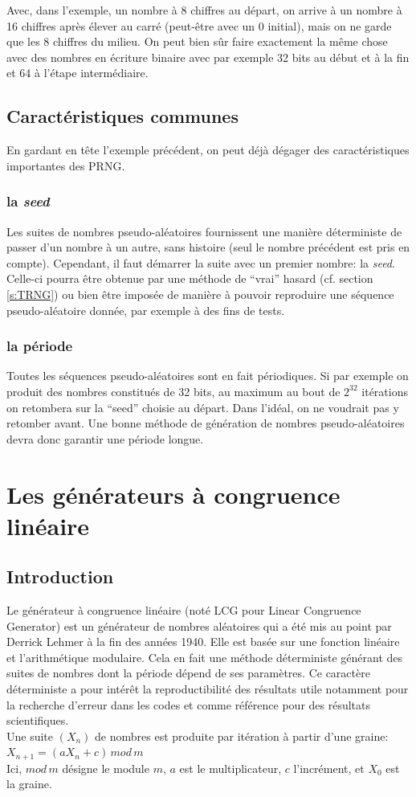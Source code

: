 \documentclass{scrartcl}
\begin{document}
Avec, dans l'exemple, un nombre à 8 chiffres au départ, on arrive à un nombre à
16 chiffres après élever au carré (peut-être avec un 0 initial), mais on ne
garde que les 8 chiffres du milieu. On peut bien sûr faire exactement la même
chose avec des nombres en écriture binaire avec par exemple 32 bits au début et
à la fin et 64 à l'étape intermédiaire.

\subsection{Caractéristiques communes}
En gardant en tête l'exemple précédent, on peut déjà dégager des
caractéristiques importantes des PRNG.
\subsubsection{la \textit{seed}}
Les suites de nombres pseudo-aléatoires fournissent une manière déterministe de
passer d'un nombre à un autre, sans histoire (seul le nombre précédent est pris
en compte). Cependant, il faut démarrer la suite avec un premier nombre: la
\textit{seed}. Celle-ci pourra être obtenue par une méthode de ``vrai'' hasard
(cf. section \ref{s:TRNG}) ou bien être imposée de manière à pouvoir reproduire
une séquence pseudo-aléatoire donnée, par exemple à des fins de tests.
\subsubsection{la période}
Toutes les séquences pseudo-aléatoires sont en fait périodiques. Si par exemple
on produit des nombres constitués de 32 bits, au maximum au bout de $2^{32}$
itérations on retombera sur la ``seed'' choisie au départ. Dans l'idéal, on ne
voudrait pas y retomber avant. Une bonne méthode de génération de nombres
pseudo-aléatoires devra donc garantir une période longue.

\section{Les générateurs à congruence linéaire}
\subsection{Introduction}
Le générateur à congruence linéaire (noté LCG pour Linear Congruence Generator) est un générateur de nombres aléatoires qui a été mis au point par Derrick Lehmer à la fin des années 1940. Elle est basée sur une fonction linéaire et l'arithmétique modulaire. Cela en fait une méthode déterministe générant des suites de nombres dont la période dépend de ses paramètres.
Ce caractère déterministe a pour intérêt la reproductibilité des résultats utile notamment pour la recherche d'erreur dans les codes et comme référence pour des résultats scientifiques.\\
Une suite $(X_n)$ de nombres est produite par itération à partir d'une graine:\linebreak
$X_{n+1} = (a X_n +c)\, mod\, m$\\
Ici, $mod \, m$ désigne le module $m$,
$a$ est le multiplicateur,
$c$ l'incrément,
et $X_0$ est la graine. \\
\end{document}
